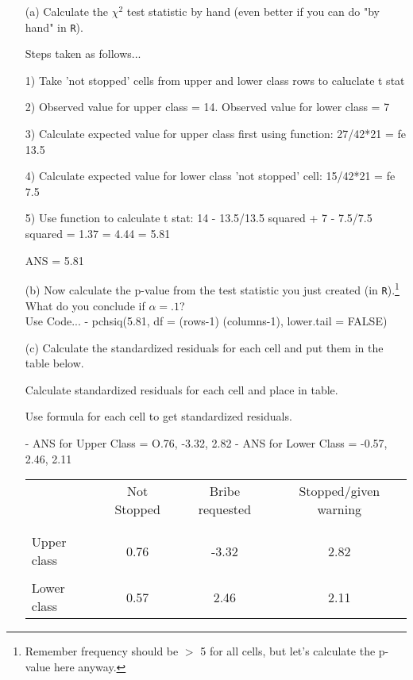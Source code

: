 \documentclass[12pt,letterpaper]{article}
\begin{document}
\begin{enumerate}
	
	\item [(a)]
	Calculate the $\chi^2$ test statistic by hand (even better if you can do "by hand" in \texttt{R}).\\
	\vspace{1cm}
	
	Steps taken as follows...
	
	1) Take 'not stopped' cells from upper and lower class rows to caluclate t stat
	
	2) Observed value for upper class = 14. Observed value for lower class = 7

 3) Calculate expected value for upper class first using function: 27/42*21 = fe 13.5

4) Calculate expected value for lower class 'not stopped' cell:  
15/42*21 = fe 7.5

5) Use function to calculate t stat: 
14 - 13.5/13.5 squared + 7 - 7.5/7.5 squared = 1.37 = 4.44 = 5.81
	
 ANS = 5.81
	
	
	\item [(b)]
	Now calculate the p-value from the test statistic you just created (in \texttt{R}).\footnote{Remember frequency should be $>$ 5 for all cells, but let's calculate the p-value here anyway.}  What do you conclude if $\alpha = .1$?\\
	Use Code...
	- pchsiq(5.81, df = (rows-1) (columns-1), lower.tail = FALSE)
	\newpage
	\item [(c)] Calculate the standardized residuals for each cell and put them in the table below.
	\vspace{1cm}
	
	Calculate standardized residuals for each cell and place in table.
	
	Use formula for each cell to get standardized residuals.
	
	- ANS for Upper Class = O.76, -3.32, 2.82
	- ANS for Lower Class = -0.57, 2.46, 2.11
	
	\begin{table}[h]
		\centering
		\begin{tabular}{l | c c c }
			& Not Stopped & Bribe requested & Stopped/given warning \\
			\\[-1.8ex] 
			\hline \\[-1.8ex]
			Upper class  & 0.76 & -3.32 & 2.82 \\
			\\
			Lower class & 0.57 & 2.46  & 2.11  \\
			

\end{tabular}
\end{table}
\end{enumerate}
\end{document}
